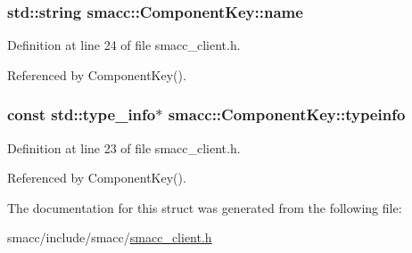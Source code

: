 \subsubsection[{\texorpdfstring{name}{name}}]{\setlength{\rightskip}{0pt plus 5cm}std\+::string smacc\+::\+Component\+Key\+::name}\hypertarget{structsmacc_1_1ComponentKey_ad38f21bde4dad1dd3c143bdc42e6f30d}{}\label{structsmacc_1_1ComponentKey_ad38f21bde4dad1dd3c143bdc42e6f30d}


Definition at line 24 of file smacc\+\_\+client.\+h.



Referenced by Component\+Key().

\subsubsection[{\texorpdfstring{typeinfo}{typeinfo}}]{\setlength{\rightskip}{0pt plus 5cm}const std\+::type\+\_\+info$\ast$ smacc\+::\+Component\+Key\+::typeinfo}\hypertarget{structsmacc_1_1ComponentKey_a148bab7ba01039d4bcabfd93529b333a}{}\label{structsmacc_1_1ComponentKey_a148bab7ba01039d4bcabfd93529b333a}


Definition at line 23 of file smacc\+\_\+client.\+h.



Referenced by Component\+Key().



The documentation for this struct was generated from the following file\+:\begin{DoxyCompactItemize}
\item 
smacc/include/smacc/\hyperlink{smacc__client_8h}{smacc\+\_\+client.\+h}\end{DoxyCompactItemize}
